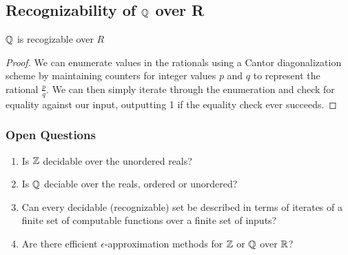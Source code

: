 
\subsection*{Recognizability of $\mathbb{Q}$ over R}

\begin{theorem}{$\mathbb{Q}$ is recogizable over $R$}
\end{theorem}
\begin{proof}
  We can enumerate values in the rationals using a Cantor
  diagonalization scheme by maintaining counters for integer values
  $p$ and $q$ to represent the rational $\frac{p}{q}$. We can then
  simply iterate through the enumeration and check for equality
  against our input, outputting 1 if the equality check ever succeeds.
\end{proof}

\subsubsection*{Open Questions}

\begin{enumerate}
\item Is $\mathbb{Z}$ decidable over the unordered reals?
\item Is $\mathbb{Q}$ deciable over the reals, ordered or unordered?
\item Can every decidable (recognizable) set be described in terms of
  iterates of a finite set of computable functions over a finite set
  of inputs?
\item Are there efficient $\epsilon$-approximation methods for $\mathbb{Z}$
  or $\mathbb{Q}$ over $\mathbb{R}$?

\end{enumerate}